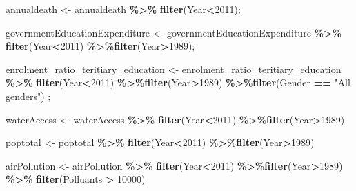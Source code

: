 \documentclass[
]{article}
\newenvironment{Shaded}{\begin{snugshade}}{\end{snugshade}}
\newcommand{\DecValTok}[1]{\textcolor[rgb]{0.00,0.00,0.81}{#1}}
\newcommand{\FunctionTok}[1]{\textcolor[rgb]{0.13,0.29,0.53}{\textbf{#1}}}
\newcommand{\NormalTok}[1]{#1}
\newcommand{\OtherTok}[1]{\textcolor[rgb]{0.56,0.35,0.01}{#1}}
\newcommand{\SpecialCharTok}[1]{\textcolor[rgb]{0.81,0.36,0.00}{\textbf{#1}}}
\newcommand{\StringTok}[1]{\textcolor[rgb]{0.31,0.60,0.02}{#1}}
\begin{document}
\begin{Shaded}
\begin{Highlighting}[]
\NormalTok{annualdeath }\OtherTok{\textless{}{-}}\NormalTok{ annualdeath }\SpecialCharTok{\%\textgreater{}\%} \FunctionTok{filter}\NormalTok{(Year}\SpecialCharTok{\textless{}}\DecValTok{2011}\NormalTok{);}

\NormalTok{governmentEducationExpenditure }\OtherTok{\textless{}{-}}\NormalTok{ governmentEducationExpenditure  }\SpecialCharTok{\%\textgreater{}\%} \FunctionTok{filter}\NormalTok{(Year}\SpecialCharTok{\textless{}}\DecValTok{2011}\NormalTok{) }\SpecialCharTok{\%\textgreater{}\%}\FunctionTok{filter}\NormalTok{(Year}\SpecialCharTok{\textgreater{}}\DecValTok{1989}\NormalTok{);}

\NormalTok{enrolment\_ratio\_teritiary\_education }\OtherTok{\textless{}{-}}\NormalTok{ enrolment\_ratio\_teritiary\_education  }\SpecialCharTok{\%\textgreater{}\%} \FunctionTok{filter}\NormalTok{(Year}\SpecialCharTok{\textless{}}\DecValTok{2011}\NormalTok{) }\SpecialCharTok{\%\textgreater{}\%}\FunctionTok{filter}\NormalTok{(Year}\SpecialCharTok{\textgreater{}}\DecValTok{1989}\NormalTok{)  }\SpecialCharTok{\%\textgreater{}\%}\FunctionTok{filter}\NormalTok{(Gender }\SpecialCharTok{==} \StringTok{"All genders"}\NormalTok{) ;}

\NormalTok{waterAccess }\OtherTok{\textless{}{-}}\NormalTok{ waterAccess }\SpecialCharTok{\%\textgreater{}\%} \FunctionTok{filter}\NormalTok{(Year}\SpecialCharTok{\textless{}}\DecValTok{2011}\NormalTok{) }\SpecialCharTok{\%\textgreater{}\%}\FunctionTok{filter}\NormalTok{(Year}\SpecialCharTok{\textgreater{}}\DecValTok{1989}\NormalTok{)}

\NormalTok{poptotal }\OtherTok{\textless{}{-}}\NormalTok{ poptotal  }\SpecialCharTok{\%\textgreater{}\%} \FunctionTok{filter}\NormalTok{(Year}\SpecialCharTok{\textless{}}\DecValTok{2011}\NormalTok{) }\SpecialCharTok{\%\textgreater{}\%}\FunctionTok{filter}\NormalTok{(Year}\SpecialCharTok{\textgreater{}}\DecValTok{1989}\NormalTok{)}

\NormalTok{airPollution }\OtherTok{\textless{}{-}}\NormalTok{ airPollution }\SpecialCharTok{\%\textgreater{}\%} \FunctionTok{filter}\NormalTok{(Year}\SpecialCharTok{\textless{}}\DecValTok{2011}\NormalTok{) }\SpecialCharTok{\%\textgreater{}\%}\FunctionTok{filter}\NormalTok{(Year}\SpecialCharTok{\textgreater{}}\DecValTok{1989}\NormalTok{) }\SpecialCharTok{\%\textgreater{}\%} \FunctionTok{filter}\NormalTok{(Polluants }\SpecialCharTok{\textgreater{}} \DecValTok{10000}\NormalTok{)}


\end{Highlighting}
\end{Shaded}
\end{document}
